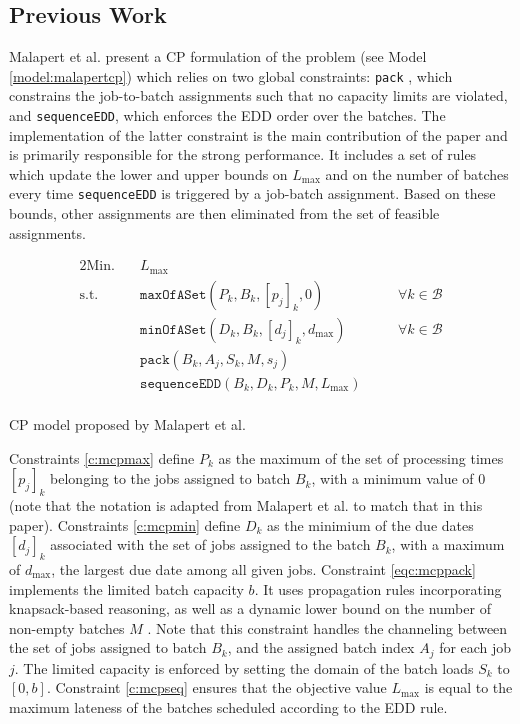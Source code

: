 \documentclass[oribibl]{llncs}
\def\Lmax{{L_{\mathrm{max}}}}
\begin{document}
\subsection{Previous Work}

Malapert et al. \cite{Malapert} present a CP formulation of the problem
(see Model \ref{model:malapertcp}) which relies on two
global constraints: \texttt{pack} \cite{Shaw04a}, which constrains the
job-to-batch assignments such that no capacity limits are violated,
and \texttt{sequenceEDD}, which enforces the EDD order over the batches. The
implementation of the latter constraint is the main contribution of
the paper and is primarily responsible for the strong performance. It
includes a set of rules which update the lower and upper bounds on
$\Lmax$ and on the number of batches every time \texttt{sequenceEDD}
is triggered by a job-batch assignment. Based on these bounds, other
assignments are then eliminated from the set of feasible assignments.

\begin{model}
  \label{model:malapertcp}
  \begin{alignat}{2}
    \mathrm{Min.}\quad & \Lmax &&  \\
    \mathrm{s.t.}\quad \label{c:mcpmax} & \mathtt{maxOfASet}(P_k, B_k, [p_j]_k,
    0) && \quad \forall k \in \mathcal{B} \\
    \label{c:mcpmin} & \mathtt{minOfASet}(D_k, B_k, [d_j]_k, d_\mathrm{max}) &&
    \quad \forall k \in \mathcal{B} \\
    \label{c:mcppack} & \mathtt{pack}(B_k, A_j, S_k, M, s_j) && \\
    \label{c:mcpseq} & \mathtt{sequenceEDD}(B_k, D_k, P_k, M, \Lmax)
    && \\
\end{alignat}
  \caption{CP model proposed by Malapert et al.}
\end{model}

Constraints \eqref{c:mcpmax} define $P_k$ as the maximum of the set
of processing times $[p_j]_k$ belonging to the jobs assigned to
batch $B_k$, with a minimum value of 0 (note that the notation is
adapted from Malapert et al. to match that in this paper). Constraints
\eqref{c:mcpmin} define $D_k$ as the minimium of the due dates $[d_j]_k$
associated with the set of jobs assigned to the batch $B_k$, with a
maximum of $d_\mathrm{max}$, the largest due date among all given jobs.
Constraint \eqref{eqc:mcppack} implements the limited batch capacity $b$.
It uses propagation rules incorporating knapsack-based reasoning, as
well as a dynamic lower bound on the number of non-empty batches $M$
\cite{Malapert,ShawPacking}. Note that this constraint handles the
channeling between the set of jobs assigned to batch $B_k$, and the
assigned batch index $A_j$ for each job $j$. The limited capacity is
enforced by setting the domain of the batch loads $S_k$ to $[0, b]$.
Constraint \eqref{c:mcpseq} ensures that the objective value $\Lmax$ is
equal to the maximum lateness of the batches scheduled according to the
EDD rule.
\end{document}
